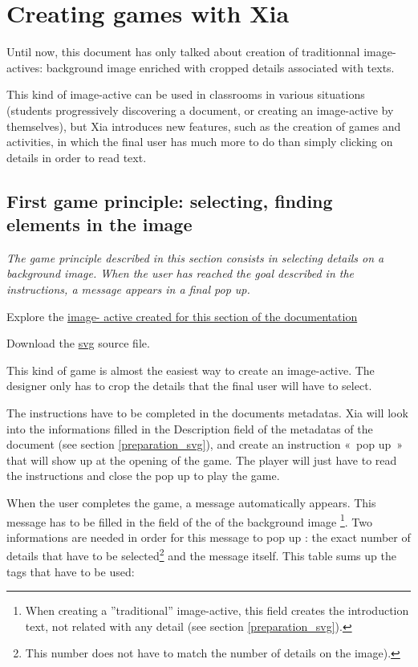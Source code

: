 \section{Creating games with Xia}\label{games_IA}

Until now, this document has only talked about creation of traditionnal image-actives: 
background image enriched with cropped details associated with texts.

This kind of image-active can be used in classrooms in various situations 
(students progressively discovering a document, or creating an image-active 
by themselves), but Xia introduces new features, 
such as the creation of games and activities, in which the final user 
has much more to do than simply clicking on details in order to read text.

\subsection{First game principle: selecting, finding elements in the image}

\textit{The game principle described in this section consists in selecting details 
on a background image. When the user has reached the goal described in the 
instructions, a message appears in a final pop up.}


\begin{links}
Explore the \href{http://images-actives.crdp-versailles.fr/beta/demo/tuto/xia3}{image- 
active created for this section of the documentation} 

Download the \href{http://images-actives.crdp-versailles.fr/beta/demo/tuto/xia3/svg/xia3.svg}{svg} source file.
\end{links}

This kind of game is almost the easiest way to create an image-active.
The designer only has to crop the details that the final user will have to select. 

The instructions have to be completed in the 
documents metadatas. Xia will look into 
the informations  filled in the  \chemin
{Description} field of the metadatas of the document (see section \ref{preparation_svg}), and create an instruction «~pop up~» 
that will show up at the opening of the game. The player will just have to 
read the instructions and close the pop up to play the game.

When the user completes the game, a message automatically appears.  This message 
has to be filled in the  field of the  of the 
background image \footnote{When creating a ''traditional'' image-active, 
this field creates the introduction text, not related with any detail 
(see section \ref{preparation_svg}).}. 
Two informations are needed in order for this message to pop up :
the exact number of details that have to be selected\footnote{This number does 
not have to match the number of details on the image).}
and the message itself. This table sums up the tags that have to be used:

